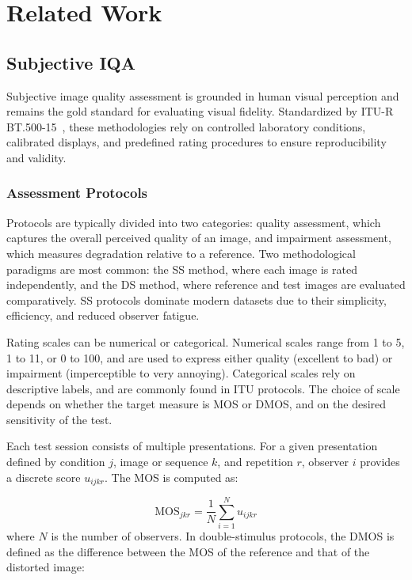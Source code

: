 \chapter{Related Work}\label{chap:related_work}

\section{Subjective \acs{IQA}}\label{sec:subjective_iqa}

Subjective image quality assessment is grounded in human visual perception and remains the gold standard for evaluating visual fidelity. Standardized by \acs{ITU-R BT.500-15}~\cite{itu2023r}, these methodologies rely on controlled laboratory conditions, calibrated displays, and predefined rating procedures to ensure reproducibility and validity.

\subsection{Assessment Protocols}\label{sec:assessment_protocols}

Protocols are typically divided into two categories: quality assessment, which captures the overall perceived quality of an image, and impairment assessment, which measures degradation relative to a reference. Two methodological paradigms are most common: the \acf{SS} method, where each image is rated independently, and the \acf{DS} method, where reference and test images are evaluated comparatively. SS protocols dominate modern datasets due to their simplicity, efficiency, and reduced observer fatigue.

Rating scales can be numerical or categorical. Numerical scales range from 1 to 5, 1 to 11, or 0 to 100, and are used to express either quality (excellent to bad) or impairment (imperceptible to very annoying). Categorical scales rely on descriptive labels, and are commonly found in ITU protocols. The choice of scale depends on whether the target measure is \acf{MOS} or \acf{DMOS}, and on the desired sensitivity of the test.

Each test session consists of multiple presentations. For a given presentation defined by condition $j$, image or sequence $k$, and repetition $r$, observer $i$ provides a discrete score $u_{ijkr}$. The MOS is computed as:

\begin{equation}
\text{MOS}_{jkr} = \frac{1}{N} \sum_{i=1}^{N} u_{ijkr}
\end{equation}
where $N$ is the number of observers. In double-stimulus protocols, the DMOS is defined as the difference between the MOS of the reference and that of the distorted image:

